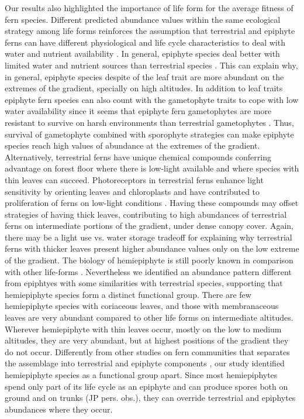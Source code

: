 \documentclass[12pt]{article}
\begin{document}
Our results also highlighted the importance of life form for the average
fitness of fern species.
Different predicted abundance values within the same ecological
strategy among life forms reinforces the assumption that terrestrial
and epiphyte ferns can have different physiological and life cycle
characteristics to deal with water and nutrient availability
\citep{Page2002, Watkins2012}. In general, epiphyte species 
deal better with limited water and nutrient sources than
terrestrial species \citep{Page2002, Schuettpelz2009,
Watkins2012}. This can explain why, in general, epiphyte species
despite of the leaf trait are more  
abundant on the
extremes of the gradient, specially on high altitudes. In addition to
leaf traits epiphyte fern species can also count with the gametophyte
traits to cope with low water availability since it seems
that epiphyte fern gametophytes are more resistant to survive on harsh
environments than terrestrial gametophytes \citep{Watkins2012}. 
Thus,
survival of gametophyte combined with sporophyte strategies can make
epiphyte species reach high values of abundance at 
 the extremes of the gradient. 
Alternatively,
terrestrial ferns have unique chemical compounds conferring advantage
on forest floor where there is low-light available \citep{Kawai2003}
and where species with thin leaves can succeed. Photoreceptors in terrestrial ferns
enhance light sensitivity by orienting leaves and chloroplasts and
have contributed to proliferation of ferns on low-light conditions
\citep{Kawai2003}. Having these compounds may offset strategies of
having thick leaves, contributing to high abundances of terrestrial
ferns on intermediate portions of the gradient, under dense canopy
cover. 
Again, there may be
a light use vs. water storage tradeoff for explaining why terrestrial
ferns with thicker leaves present higher abundance values only on the low
extreme of the gradient.  The biology of hemiepiphyte is still poorly
known in comparison with other life-forms
\citep{Watkins2012}. Nevertheless we identified an abundance pattern
different from epiphtyes with some similarities with terrestrial
species, supporting that hemiepiphyte species form a distinct
functional group.  There are few hemiepiphyte species with coriaceous
leaves, and those with membranaceous leaves are very abundant compared
to other life forms on intermediate altitudes.
Wherever hemiepiphyte with thin leaves occur,
mostly on the low to medium altitudes, they are very abundant, but
at highest positions of the gradient they do not occur.  Differently
from other studies on fern communities that separates the assemblage
into terrestrial and epiphyte components \citep{WatkinsJr2006,
Kluge2010}, our study identified hemiepiphyte species as a functional
group apart. Since most hemiepiphytes spend only part of its life
cycle as an epiphyte and can produce spores both on ground and on
trunks (JP pers. obs.), they can override terrestrial and
epiphytes abundances where they occur. 
\end{document}
